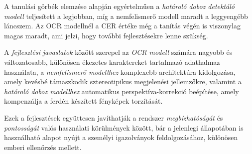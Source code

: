 \documentclass[
]{thesis-ekf}
\theoremstyle{definition}
\theoremstyle{remark}
\begin{document}
A tanulási görbék elemzése alapján egyértelműen a \emph{határoló doboz detektáló modell} teljesített a legjobban, míg a nemfelismerő modell maradt a leggyengébb láncszem. Az OCR modellnél a CER értéke még a tanítás végén is viszonylag magas maradt, ami jelzi, hogy további fejlesztésekre lenne szükség.

A \emph{fejlesztési javaslatok} között szerepel az \emph{OCR modell} számára nagyobb és változatosabb, különösen ékezetes karaktereket tartalmazó adathalmaz használata, a \emph{nemfelismerő modellhez} komplexebb architektúra kidolgozása, amely kevésbé támaszkodik sztereotipikus megjelenési jellemzőkre, valamint a \emph{határoló doboz modellhez} automatikus perspektíva-korrekció beépítése, amely kompenzálja a ferdén készített fényképek torzítását.

Ezek a fejlesztések együttesen javíthatják a rendszer \emph{megbízhatóságát} és \emph{pontosságát} valós használati körülmények között, bár a jelenlegi állapotában is használható alapot nyújt a személyi igazolványok feldolgozásához, különösen emberi ellenőrzés mellett.
\end{document}
